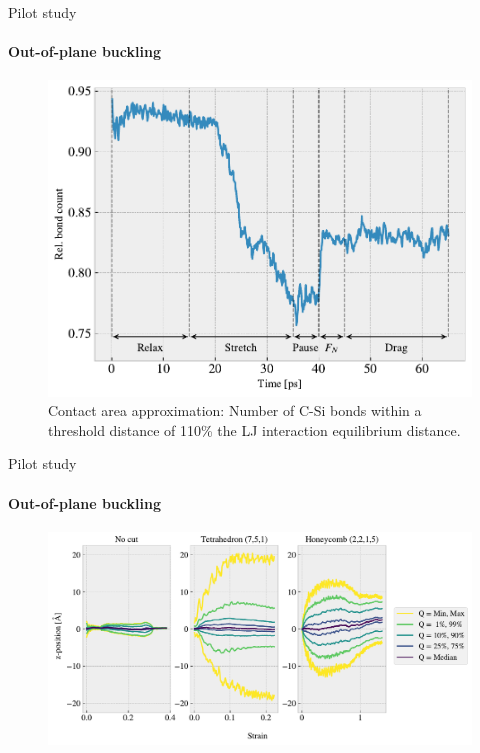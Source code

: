 \documentclass[
	10pt, %
]{beamer}
\begin{document}
%
%
\begin{frame}{Pilot study}
	\framesubtitle{Out-of-plane buckling}
	\begin{figure}
		\includegraphics[height=0.7\textheight]{figures/contact_pct.pdf}
		\caption{Contact area approximation: Number of C-Si bonds within a threshold distance of 110\% the LJ interaction equilibrium distance.}
	\end{figure}	
\end{frame}
%
%
\begin{frame}{Pilot study}
	\framesubtitle{Out-of-plane buckling}
	\begin{figure}[H]
		\centering
		\includegraphics[width=\linewidth]{../thesis/figures/baseline/vacuum_normal_buckling.pdf}
	 \end{figure}
\end{frame}
\end{document}
